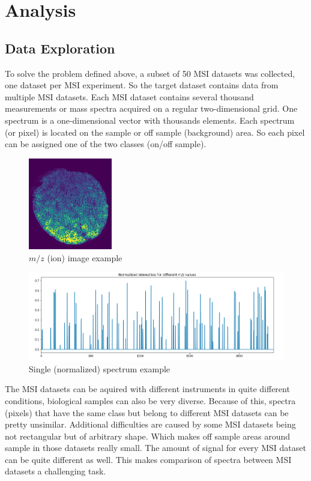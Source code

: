 \documentclass[a4paper]{article}
\begin{document}
    \pagebreak
    \section*{Analysis}
    
    \subsection*{Data Exploration}
    
    To solve the problem defined above, a subset of 50 MSI datasets was collected, one dataset per
    MSI experiment. So the target dataset contains data from multiple MSI datasets.
    Each MSI dataset contains several
    thousand measurements or mass spectra acquired on a regular two-dimensional grid. One spectrum is
    a one-dimensional vector with thousands elements. Each spectrum (or pixel) is located on the sample
    or off sample (background) area. So each pixel can be assigned one of the two classes (on/off sample).
    
    \begin{figure}[H]
        \centering
            \includegraphics[width=\textwidth,height=4cm,keepaspectratio]{ion_image_2.png}
        \caption{$m/z$ (ion) image example}
    \end{figure}
    
    \begin{figure}[H]
        \centering
            \includegraphics[width=1.\textwidth]{spectrum_graph_1.png}
        \caption{Single (normalized) spectrum example}
    \end{figure}
    
    The MSI datasets can be aquired with different instruments in quite different conditions, biological
    samples can also be very diverse. Because of this, spectra (pixels) that have the same class but belong
    to different MSI datasets can be pretty unsimilar. Additional difficulties are caused by some MSI datasets
    being not rectangular but of arbitrary shape. Which makes off sample areas around sample in those datasets
    really small. The amount of signal for every MSI dataset can be quite different as well. This makes 
    comparison of spectra between MSI datasets a challenging task.
    
\end{document}

